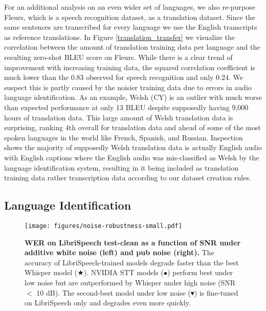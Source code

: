 For an additional analysis on an even wider set of languages, we also re-purpose Fleurs, which is a speech recognition dataset, as a translation dataset. Since the same sentences are transcribed for every language we use the English transcripts as reference translations. In Figure \ref{translation_transfer} we visualize the correlation between the amount of translation training data per language and the resulting zero-shot BLEU score on Fleurs. While there is a clear trend of improvement with increasing training data, the squared correlation coefficient is much lower than the 0.83 observed for speech recognition and only 0.24. We suspect this is partly caused by the noisier training data due to errors in audio language identification. As an example, Welsh ({\footnotesize\textsf{CY}}) is an outlier with much worse than expected performance at only 13 BLEU despite supposedly having 9,000 hours of translation data. This large amount of Welsh translation data is surprising, ranking 4th overall for translation data and ahead of some of the most spoken languages in the world like French, Spanish, and Russian. Inspection shows the majority of supposedly Welsh translation data is actually English audio with English captions where the English audio was mis-classified as Welsh by the language identification system, resulting in it being included as translation training data rather transcription data according to our dataset creation rules.

\subsection{Language Identification}\label{subsec:language-id}

\begin{figure}[t]
\begin{center}
\centerline{\texttt{[image: figures/noise-robustness-small.pdf]}}
\caption{\textbf{WER on LibriSpeech test-clean as a function of SNR under additive white noise (left) and pub noise (right).} The accuracy of LibriSpeech-trained models degrade faster than the best Whisper model ({\color{red}$\bigstar$}). NVIDIA STT models ({\color{C2}$\bullet$}) perform best under low noise but are outperformed by Whisper under high noise (SNR $<$ 10 dB). The second-best model under low noise ({\color{C0}$\blacktriangledown$}) is fine-tuned on LibriSpeech only and degrades even more quickly.}
\label{fig:noise-robustness}
\end{center}
\vspace{-1em}
\end{figure}

